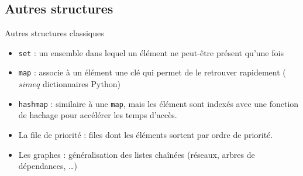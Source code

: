 \documentclass{beamer}
\begin{document}
\subsection{Autres structures}

\begin{frame}{Autres structures classiques}
\begin{itemize}
\item \texttt{set} : un ensemble dans lequel un élément ne peut-être présent qu'une fois
\item \texttt{map} : associe à un élément une clé qui permet de le retrouver rapidement ($simeq$ dictionnaires Python)
\item \texttt{hashmap} : similaire à une \texttt{map}, mais les élément sont indexés avec une fonction de hachage pour accélérer les temps d'accès.
\item La file de priorité : files dont les éléments sortent par ordre de priorité.
\item Les graphes : généralisation des listes chaînées (réseaux, arbres de dépendances, \dots)
\end{itemize}
\end{frame}
\end{document}
